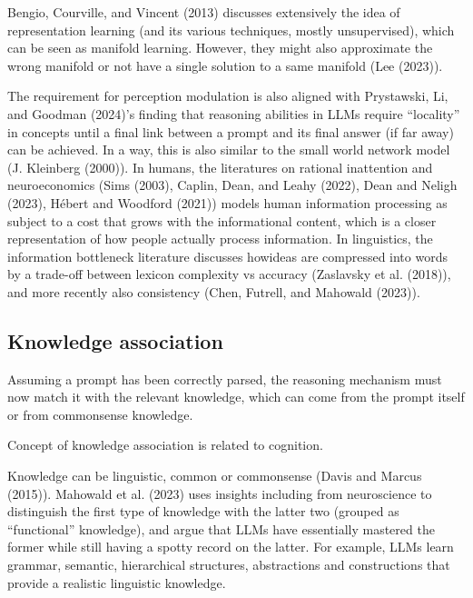 \documentclass[
]{article}
\begin{document}
Bengio, Courville, and Vincent (2013) discusses extensively the idea of
representation learning (and its various techniques, mostly
unsupervised), which can be seen as manifold learning. However, they
might also approximate the wrong manifold or not have a single solution
to a same manifold (Lee (2023)).

The requirement for perception modulation is also aligned with
Prystawski, Li, and Goodman (2024)'s finding that reasoning abilities in
LLMs require ``locality'' in concepts until a final link between a
prompt and its final answer (if far away) can be achieved. In a way,
this is also similar to the small world network model (J. Kleinberg
(2000)). In humans, the literatures on rational inattention and
neuroeconomics (Sims (2003), Caplin, Dean, and Leahy (2022), Dean and
Neligh (2023), Hébert and Woodford (2021)) models human information
processing as subject to a cost that grows with the informational
content, which is a closer representation of how people actually process
information. In linguistics, the information bottleneck literature
discusses howideas are compressed into words by a trade-off between
lexicon complexity vs accuracy (Zaslavsky et al. (2018)), and more
recently also consistency (Chen, Futrell, and Mahowald (2023)).

\subsection{Knowledge association}\label{knowledge-association}

Assuming a prompt has been correctly parsed, the reasoning mechanism
must now match it with the relevant knowledge, which can come from the
prompt itself or from commonsense knowledge.

Concept of knowledge association is related to cognition.

Knowledge can be linguistic, common or commonsense (Davis and Marcus
(2015)). Mahowald et al. (2023) uses insights including from
neuroscience to distinguish the first type of knowledge with the latter
two (grouped as ``functional'' knowledge), and argue that LLMs have
essentially mastered the former while still having a spotty record on
the latter. For example, LLMs learn grammar, semantic, hierarchical
structures, abstractions and constructions that provide a realistic
linguistic knowledge.
\end{document}
